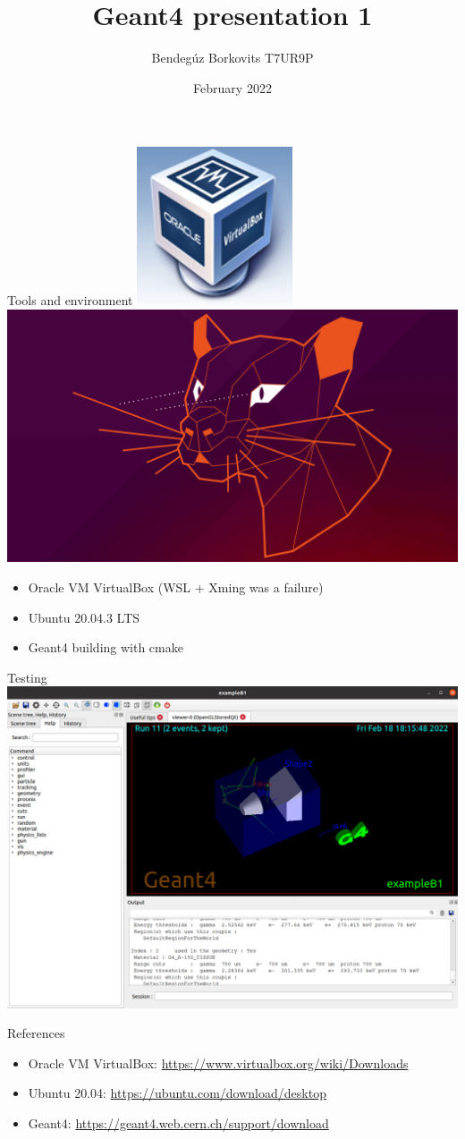 \documentclass[11pt]{beamer}
\author{Bendegúz Borkovits T7UR9P}
\title{Geant4 presentation 1}
\institute{Scientific Modeling Computer Laboratory}
\date{February 2022}
\begin{document}
\begin{frame}
\titlepage
\end{frame}

\begin{frame}{Tools and environment}
    \centering
    \includegraphics[]{virtbox.png}
    \includegraphics[scale = 0.1]{ubuntu-20-04-fossa.jpg} 
    \begin{itemize}
        \item Oracle VM VirtualBox (WSL + Xming was a failure)
        \item Ubuntu 20.04.3 LTS
        \item Geant4 building with cmake
    \end{itemize}
\end{frame}

\begin{frame}{Testing}
    \includegraphics[scale=0.4]{geantkep.png}
\end{frame}

\begin{frame}{References}
    \begin{itemize}
    \item Oracle VM VirtualBox: \url{https://www.virtualbox.org/wiki/Downloads}
    \item Ubuntu 20.04: \url{https://ubuntu.com/download/desktop}
    \item Geant4: \url{https://geant4.web.cern.ch/support/download}
\end{itemize}
\end{frame}
\end{document}
